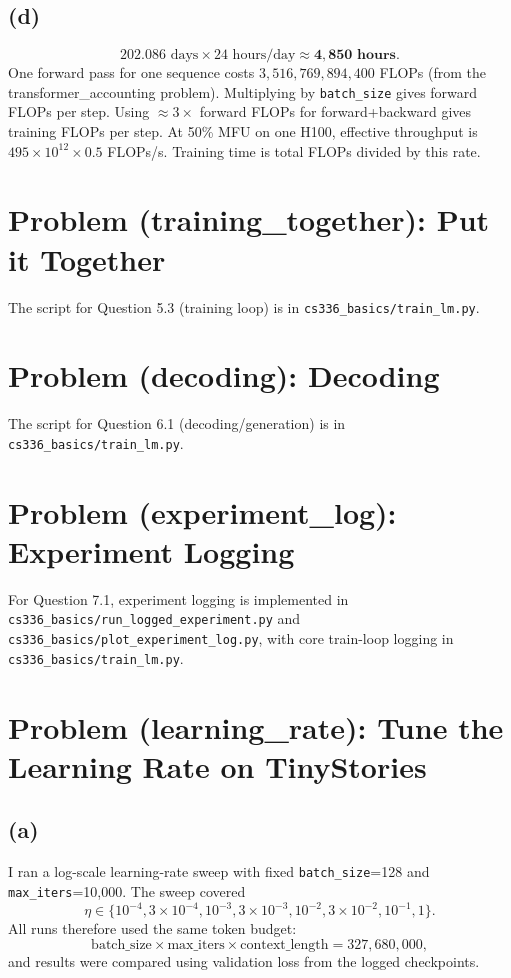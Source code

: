 \documentclass[11pt]{article}
\begin{document}
\subsection*{(d)}
\[
202.086 \text{ days} \times 24 \text{ hours/day} \approx \mathbf{4,850 \text{ hours}}.
\]
One forward pass for one sequence costs \(3{,}516{,}769{,}894{,}400\) FLOPs (from the transformer\_accounting problem). Multiplying by \texttt{batch\_size} gives forward FLOPs per step. Using \(\approx 3\times\) forward FLOPs for forward+backward gives training FLOPs per step. At 50\% MFU on one H100, effective throughput is \(495\times 10^{12}\times 0.5\) FLOPs/s. Training time is total FLOPs divided by this rate.

\section{Problem (training\_together): Put it Together}
The script for Question 5.3 (training loop) is in \texttt{cs336\_basics/train\_lm.py}.

\section{Problem (decoding): Decoding}
The script for Question 6.1 (decoding/generation) is in \texttt{cs336\_basics/train\_lm.py}.

\section{Problem (experiment\_log): Experiment Logging}
For Question 7.1, experiment logging is implemented in \texttt{cs336\_basics/run\_logged\_experiment.py} and \texttt{cs336\_basics/plot\_experiment\_log.py}, with core train-loop logging in \texttt{cs336\_basics/train\_lm.py}.

\section{Problem (learning\_rate): Tune the Learning Rate on TinyStories}
\subsection*{(a)}
I ran a log-scale learning-rate sweep with fixed \texttt{batch\_size}=128 and \texttt{max\_iters}=10{,}000. The sweep covered
\[
\eta \in \{10^{-4}, 3\times 10^{-4}, 10^{-3}, 3\times 10^{-3}, 10^{-2}, 3\times 10^{-2}, 10^{-1}, 1\}.
\]
All runs therefore used the same token budget:
\[
\text{batch\_size}\times \text{max\_iters}\times \text{context\_length}=327{,}680{,}000,
\]
and results were compared using validation loss from the logged checkpoints.
\end{document}
